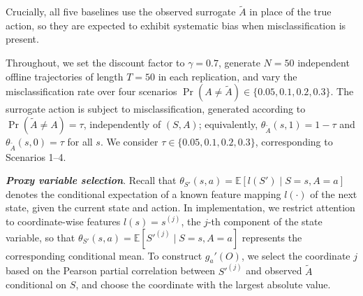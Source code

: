 \documentclass[12pt]{article}
\newcommand{\0}{\boldsymbol{0}}
\newcommand{\E}{\mathbb{E}}
\begin{document}
Crucially, all five baselines use the observed surrogate $\widetilde A$ in place of the true action, so they are expected to exhibit systematic bias when misclassification is present. 

Throughout, we set the discount factor to $\gamma=0.7$, generate $N=50$ independent offline trajectories of length $T=50$ in each replication, and vary the misclassification rate over four scenarios $ \Pr(A \neq \widetilde A) \in\{0.05,0.1,0.2,0.3\}$. The surrogate action is subject to misclassification, generated according to $\Pr(\widetilde A\neq A)=\tau$, independently of $(S,A)$; equivalently, $\theta_{\widetilde A}(s,1)=1-\tau$ and $\theta_{\widetilde A}(s,0)=\tau$ for all $s$. We consider $\tau\in\{0.05,0.1,0.2,0.3\}$, corresponding to Scenarios 1--4.

\textbf{\textit{Proxy variable selection}}. Recall that $\theta_{S'}(s,a)=\E\!\left[l(S')\mid S=s,A=a\right]$ denotes the conditional expectation of a known feature mapping $l(\cdot)$ of the next state, given the current state and action. In implementation, we restrict attention to coordinate-wise features $l(s) = s^{(j)}$, the $j$-th component of the state variable, so that $\theta_{S'}(s,a)=\E\!\left[S'^{(j)}\mid S=s,A=a\right]$ represents the corresponding conditional mean. To construct $g_a'(O)$, we select the coordinate $j$ based on the Pearson partial correlation between $S'^{(j)}$ and observed $\widetilde A$ conditional on $S$, and choose the coordinate with the largest absolute value.
\end{document}
